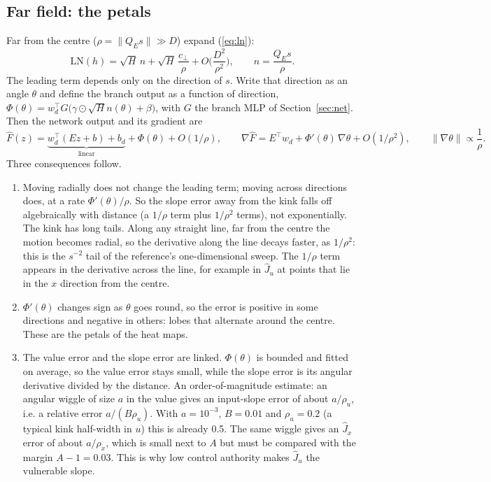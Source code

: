 \documentclass[11pt]{article}
\begin{document}
\subsection{Far field: the petals}
Far from the centre ($\rho=\|Q_E s\|\gg D$) expand (\ref{eq:ln}):
\begin{equation}
\mathrm{LN}(h) = \sqrt H\,n + \sqrt H\,\frac{c_\perp}{\rho} + O\!\Big(\frac{D^2}{\rho^2}\Big),\qquad n = \frac{Q_E s}{\rho}.
\end{equation}
The leading term depends only on the direction of $s$. Write that direction as an angle $\theta$ and define the branch output as a function of direction, $\Phi(\theta)=w_d^\top G\big(\gamma\odot\sqrt H n(\theta)+\beta\big)$, with $G$ the branch MLP of Section~\ref{sec:net}. Then the network output and its gradient are
\begin{equation}
\hat F(z) = \underbrace{w_d^\top(Ez+b)+b_d}_{\text{linear}} + \Phi(\theta) + O(1/\rho),\qquad
\nabla\hat F = E^\top w_d + \Phi'(\theta)\,\nabla\theta + O(1/\rho^2),\qquad \|\nabla\theta\|\propto\frac1\rho .
\end{equation}
Three consequences follow.
\begin{enumerate}
\item Moving radially does not change the leading term; moving across directions does, at a rate $\Phi'(\theta)/\rho$. So the slope error away from the kink falls off algebraically with distance (a $1/\rho$ term plus $1/\rho^2$ terms), not exponentially. The kink has long tails. Along any straight line, far from the centre the motion becomes radial, so the derivative along the line decays faster, as $1/\rho^2$: this is the $s^{-2}$ tail of the reference's one-dimensional sweep. The $1/\rho$ term appears in the derivative across the line, for example in $\hat J_u$ at points that lie in the $x$ direction from the centre.
\item $\Phi'(\theta)$ changes sign as $\theta$ goes round, so the error is positive in some directions and negative in others: lobes that alternate around the centre. These are the petals of the heat maps.
\item The value error and the slope error are linked. $\Phi(\theta)$ is bounded and fitted on average, so the value error stays small, while the slope error is its angular derivative divided by the distance. An order-of-magnitude estimate: an angular wiggle of size $a$ in the value gives an input-slope error of about $a/\rho_u$, i.e. a relative error $a/(B\rho_u)$. With $a=10^{-3}$, $B=0.01$ and $\rho_u=0.2$ (a typical kink half-width in $u$) this is already 0.5. The same wiggle gives an $\hat J_x$ error of about $a/\rho_x$, which is small next to $A$ but must be compared with the margin $A-1=0.03$. This is why low control authority makes $\hat J_u$ the vulnerable slope.
\end{enumerate}
\end{document}
